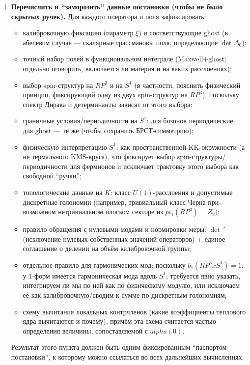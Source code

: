 \documentclass[12pt]{article}
\def\mathbb#1{#1}%
\def\alpha{alpha}%
\def\pi{pi}%
\def\times{x}%
\begin{document}
\begin{enumerate}
  \item \textbf{Перечислить и ``заморозить'' данные постановки (чтобы не было скрытых ручек).}
  Для каждого оператора и поля зафиксировать:
  \begin{itemize}
    \item калибровочную фиксацию (параметр $\xi$) и соответствующие ghost (в абелевом случае --- скалярные грассмановы поля, определяющие $\det\Delta_0$);
    \item точный набор полей в функциональном интеграле (Maxwell+ghost; отдельно оговорить, включается ли материя и на каких расслоениях);
    \item выбор spin-структур на $\mathbb{RP}^3$ и на $S^1$ (в частности, пояснить физический принцип, фиксирующий одну из двух spin-структур на $\mathbb{RP}^3$), поскольку спектр Дирака и детерминанты зависят от этого выбора;
    \item граничные условия/периодичности на $S^1$: для бозонов периодические, для ghost --- те же (чтобы сохранить БРСТ-симметрию);
    \item физическую интерпретацию $S^1$: как пространственной KK-окружности (а не термального KMS-круга), что фиксирует выбор spin-структуры/периодичности для фермионов и исключает трактовку этого выбора как свободной ``ручки'';
    \item топологические данные на $K$: класс $U(1)$-расслоения и допустимые дискретные голономии (например, тривиальный класс Черна при возможном нетривиальном плоском секторе из $\pi_1(\mathbb{RP}^3)=\mathbb{Z}_2$);
    \item правило обращения с нулевыми модами и нормировки меры: $\det\,'$ (исключение нулевых собственных значений операторов) + единое соглашение о делении на объём калибровочной группы;
    \item отдельное правило для гармонических мод: поскольку $b_1(\mathbb{RP}^3\times S^1)=1$, у 1-форм имеется гармоническая мода вдоль $S^1$; требуется явно указать, интегрируем ли мы по ней как по физическому модулю, или исключаем её как калибровочную/сводим к сумме по дискретным голономиям;
    \item схему вычитания локальных контрчленов (какие коэффициенты теплового ядра вычитаются и почему), причём эта схема считается частью определения величины, сопоставляемой с $\alpha(0)$.
  \end{itemize}
  Результат этого пункта должен быть одним фиксированным ``паспортом постановки'', к которому можно ссылаться во всех дальнейших вычислениях.


\end{enumerate}
\end{document}
